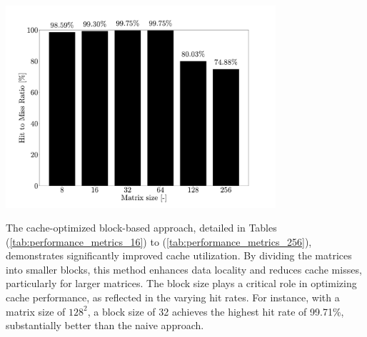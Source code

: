 \begin{center}
	\centering
	\includegraphics[width=0.75\textwidth]{figures/05-analysis/mm_naive_results.pdf}
	\label{fig:mm_naive_results}
\end{center}

\noindent The cache-optimized block-based approach, detailed in Tables (\ref{tab:performance_metrics_16}) to (\ref{tab:performance_metrics_256}), demonstrates significantly
improved cache utilization. By dividing the matrices into smaller blocks, this method enhances data locality and reduces cache misses, particularly for larger matrices. The block
size plays a critical role in optimizing cache performance, as reflected in the varying hit rates. For instance, with a matrix size of \( 128^2 \), a block size of 32 achieves the
highest hit rate of 99.71\%, substantially better than the naive approach.

